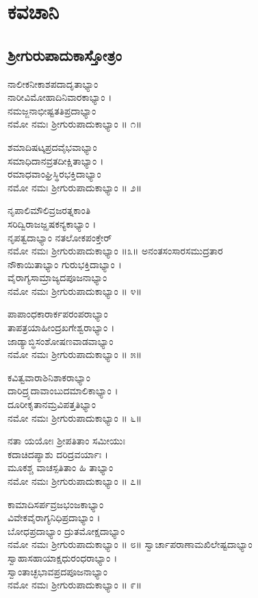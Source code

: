 \chapter*{\center ಕವಚಾನಿ }
\fancyhead[RL]{}
\section{ಶ್ರೀಗುರುಪಾದುಕಾಸ್ತೋತ್ರಂ }
ನಾಲೀಕನೀಕಾಶಪದಾದೃತಾಭ್ಯಾಂ \\ನಾರೀವಿಮೋಹಾದಿನಿವಾರಕಾಭ್ಯಾಂ ।\\
ನಮಜ್ಜನಾಭೀಷ್ಟತತಿಪ್ರದಾಭ್ಯಾಂ \\ನಮೋ ನಮಃ ಶ್ರೀಗುರುಪಾದುಕಾಭ್ಯಾಂ ॥ ೧॥

ಶಮಾದಿಷಟ್ಕಪ್ರದವೈಭವಾಭ್ಯಾಂ\\ ಸಮಾಧಿದಾನವ್ರತದೀಕ್ಷಿತಾಭ್ಯಾಂ ।\\
ರಮಾಧವಾಂಘ್ರಿಸ್ಥಿರಭಕ್ತಿದಾಭ್ಯಾಂ \\ನಮೋ ನಮಃ ಶ್ರೀಗುರುಪಾದುಕಾಭ್ಯಾಂ ॥ ೨॥

ನೃಪಾಲಿಮೌಲಿವ್ರಜರತ್ನಕಾಂತಿ\\ಸರಿದ್ವಿರಾಜಜ್ಝಷಕನ್ಯಕಾಭ್ಯಾಂ ।\\
ನೃಪತ್ವದಾಭ್ಯಾಂ ನತಲೋಕಪಂಕ್ತೇರ್\\ನಮೋ ನಮಃ ಶ್ರೀಗುರುಪಾದುಕಾಭ್ಯಾಂ ॥೩॥
\newpage
ಅನಂತಸಂಸಾರಸಮುದ್ರತಾರ\\ನೌಕಾಯಿತಾಭ್ಯಾಂ ಗುರುಭಕ್ತಿದಾಭ್ಯಾಂ ।\\
ವೈರಾಗ್ಯಸಾಮ್ರಾಜ್ಯದಪೂಜನಾಭ್ಯಾಂ \\ನಮೋ ನಮಃ ಶ್ರೀಗುರುಪಾದುಕಾಭ್ಯಾಂ ॥ ೪॥

ಪಾಪಾಂಧಕಾರಾರ್ಕಪರಂಪರಾಭ್ಯಾಂ\\ ತಾಪತ್ರಯಾಹೀಂದ್ರಖಗೇಶ್ವರಾಭ್ಯಾಂ ।\\
ಜಾಡ್ಯಾಬ್ಧಿಸಂಶೋಷಣವಾಡವಾಭ್ಯಾಂ \\ನಮೋ ನಮಃ ಶ್ರೀಗುರುಪಾದುಕಾಭ್ಯಾಂ ॥ ೫॥

ಕವಿತ್ವವಾರಾಶಿನಿಶಾಕರಾಭ್ಯಾಂ \\ದಾರಿದ್ರ್ಯದಾವಾಂಬುದಮಾಲಿಕಾಭ್ಯಾಂ ।\\
ದೂರೀಕೃತಾನಮ್ರವಿಪತ್ತತಿಭ್ಯಾಂ \\ನಮೋ ನಮಃ ಶ್ರೀಗುರುಪಾದುಕಾಭ್ಯಾಂ ॥ ೬॥

ನತಾ ಯಯೋಃ ಶ್ರೀಪತಿತಾಂ ಸಮೀಯುಃ\\ ಕದಾಚಿದಪ್ಯಾಶು ದರಿದ್ರವರ್ಯಾಃ ।\\
ಮೂಕಶ್ಚ ವಾಚಸ್ಪತಿತಾಂ ಹಿ ತಾಭ್ಯಾಂ \\ನಮೋ ನಮಃ ಶ್ರೀಗುರುಪಾದುಕಾಭ್ಯಾಂ ॥ ೭॥

ಕಾಮಾದಿಸರ್ಪವ್ರಜಭಂಜಕಾಭ್ಯಾಂ\\ ವಿವೇಕವೈರಾಗ್ಯನಿಧಿಪ್ರದಾಭ್ಯಾಂ ।\\
ಬೋಧಪ್ರದಾಭ್ಯಾಂ ದ್ರುತಮೋಕ್ಷದಾಭ್ಯಾಂ \\ನಮೋ ನಮಃ ಶ್ರೀಗುರುಪಾದುಕಾಭ್ಯಾಂ ॥ ೮॥
\newpage
ಸ್ವಾರ್ಚಾಪರಾಣಾಮಖಿಲೇಷ್ಟದಾಭ್ಯಾಂ\\ ಸ್ವಾಹಾಸಹಾಯಾಕ್ಷಧುರಂಧರಾಭ್ಯಾಂ ।\\
ಸ್ವಾಂತಾಚ್ಛಭಾವಪ್ರದಪೂಜನಾಭ್ಯಾಂ \\ನಮೋ ನಮಃ ಶ್ರೀಗುರುಪಾದುಕಾಭ್ಯಾಂ ॥ ೯॥

